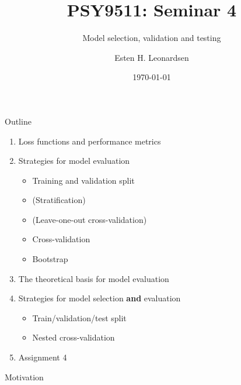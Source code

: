 \documentclass{beamer}
\title{PSY9511: Seminar 4}
\subtitle{Model selection, validation and testing}
\author{Esten H. Leonardsen}
\date{\today}
\begin{document}
	\begin{frame}
	 	\titlepage
	\end{frame}

    \begin{frame}{Outline}
        \begin{enumerate}
            \item Loss functions and performance metrics
            \item Strategies for model evaluation
            \begin{itemize}
                \item Training and validation split
                \item (Stratification)
                \item (Leave-one-out cross-validation)
                \item Cross-validation
                \item Bootstrap
            \end{itemize}
            \item The theoretical basis for model evaluation
            \item Strategies for model selection \textbf{and} evaluation
            \begin{itemize}
                \item Train/validation/test split
                \item Nested cross-validation
            \end{itemize}
            \item Assignment 4
        \end{enumerate}
    \end{frame}

    \begin{frame}{Motivation}
    \end{frame}

    
    
    
    
\end{document}
